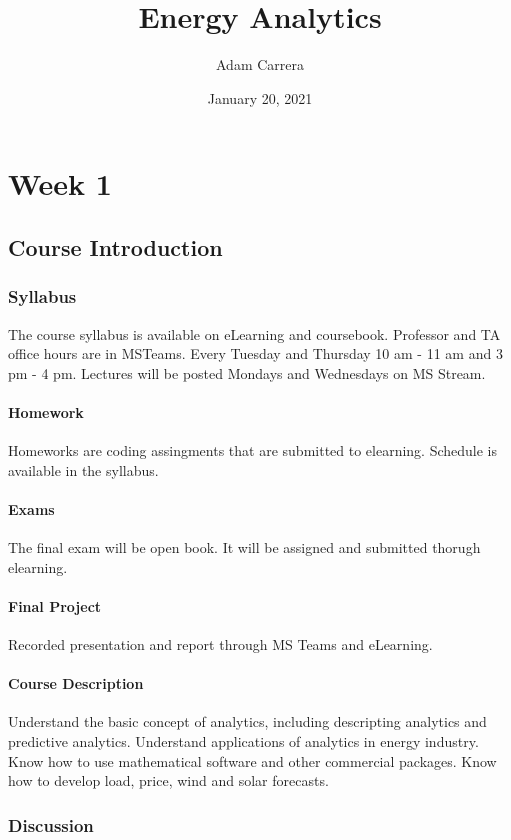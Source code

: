 \documentclass[12pt, a4paper]{report}
\title{Energy Analytics}
\author{Adam Carrera}
\date{January 20, 2021}
\begin{document}
  \maketitle
  \tableofcontents
  \part{Week 1}
  \chapter{Course Introduction}
  \section{Syllabus}
  The course syllabus is available on eLearning and coursebook. Professor and TA office hours are in MSTeams. Every Tuesday and Thursday 10 am - 11 am and 3 pm - 4 pm. Lectures will be posted Mondays and Wednesdays on MS Stream.

  \subsection{Homework}
  Homeworks are coding assingments that are submitted to elearning. Schedule is available in the syllabus.

  \subsection{Exams}
  The final exam will be open book. It will be assigned and submitted thorugh elearning.

  \subsection{Final Project}
  Recorded presentation and report through MS Teams and eLearning.

  \subsection{Course Description}
  Understand the basic concept of analytics, including descripting analytics and predictive analytics. Understand applications of analytics in energy industry. Know how to use mathematical software and other commercial packages. Know how to develop load, price, wind and solar forecasts.

  \section{Discussion}
\end{document}
